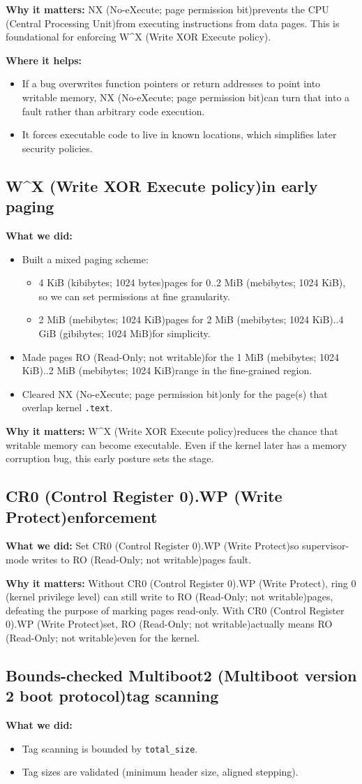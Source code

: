 \documentclass[11pt]{article}
\newcommand{\CPU}{CPU (Central Processing Unit)}
\newcommand{\CRzero}{CR0 (Control Register 0)}
\newcommand{\GiB}{GiB (gibibytes; 1024 MiB)}
\newcommand{\KiB}{KiB (kibibytes; 1024 bytes)}
\newcommand{\MBtwo}{Multiboot2 (Multiboot version 2 boot protocol)}
\newcommand{\MiB}{MiB (mebibytes; 1024 KiB)}
\newcommand{\NX}{NX (No-eXecute; page permission bit)}
\newcommand{\RO}{RO (Read-Only; not writable)}
\newcommand{\WP}{WP (Write Protect)}
\newcommand{\WX}{W\textasciicircum X (Write XOR Execute policy)}
\begin{document}
\textbf{Why it matters:}
\NX prevents the \CPU from executing instructions from data pages. This is foundational for enforcing \WX.

\textbf{Where it helps:}
\begin{itemize}
  \item If a bug overwrites function pointers or return addresses to point into writable memory, \NX can turn that into a fault rather than arbitrary code execution.
  \item It forces executable code to live in known locations, which simplifies later security policies.
\end{itemize}

\subsection{\WX in early paging}
\textbf{What we did:}
\begin{itemize}
  \item Built a mixed paging scheme:
  \begin{itemize}
    \item 4 \KiB pages for 0..2 \MiB, so we can set permissions at fine granularity.
    \item 2 \MiB pages for 2 \MiB..4 \GiB for simplicity.
  \end{itemize}
  \item Made pages \RO for the 1 \MiB..2 \MiB range in the fine-grained region.
  \item Cleared \NX only for the page(s) that overlap kernel \texttt{.text}.
\end{itemize}

\textbf{Why it matters:}
\WX reduces the chance that writable memory can become executable. Even if the kernel later has a memory corruption bug, this early posture sets the stage.

\subsection{\CRzero.\WP enforcement}
\textbf{What we did:} Set \CRzero.\WP so supervisor-mode writes to \RO pages fault.

\textbf{Why it matters:}
Without \CRzero.\WP, ring 0 (kernel privilege level) can still write to \RO pages, defeating the purpose of marking pages read-only. With \CRzero.\WP set, \RO actually means \RO even for the kernel.

\subsection{Bounds-checked \MBtwo tag scanning}
\textbf{What we did:}
\begin{itemize}
  \item Tag scanning is bounded by \texttt{total\_size}.
  \item Tag sizes are validated (minimum header size, aligned stepping).
\end{itemize}
\end{document}
